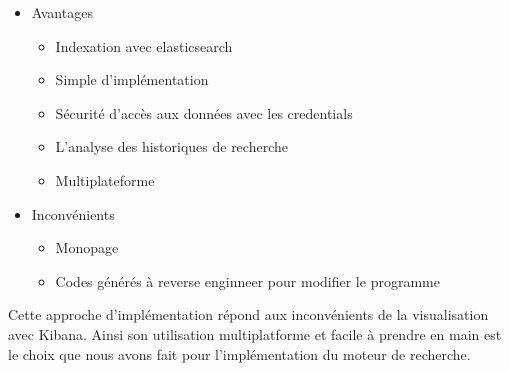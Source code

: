 \newpage
\begin{itemize}
    \item Avantages 
        \begin{itemize}
            \item Indexation avec elasticsearch
            \item Simple d’implémentation
            \item Sécurité d’accès aux données avec les credentials
            \item L’analyse des historiques de recherche
            \item Multiplateforme
        \end{itemize}
    \item Inconvénients 
        \begin{itemize}
        \item Monopage
        \item Codes générés à reverse enginneer pour modifier le programme
        \end{itemize}
\end{itemize}

Cette approche d’implémentation répond aux inconvénients de la visualisation avec Kibana.
Ainsi son utilisation multiplatforme et facile à prendre en main est le choix que nous avons fait pour l'implémentation du moteur de recherche.  
